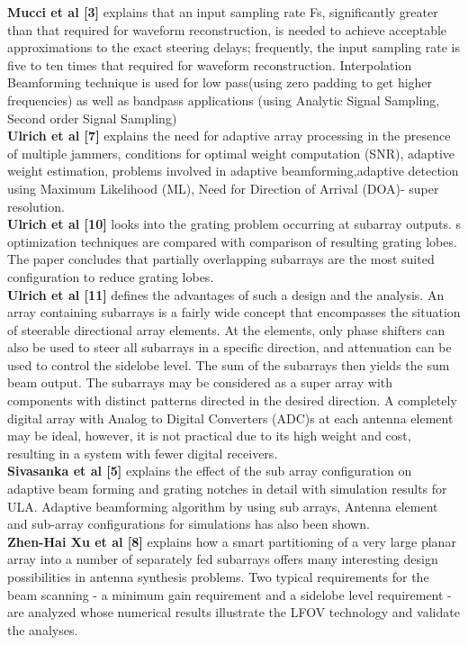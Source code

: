 \textbf{Mucci et al [3]} explains that an input sampling rate Fs, significantly greater than that required for waveform reconstruction, is needed to achieve acceptable approximations to the exact steering delays; frequently, the input sampling rate is five to ten times that required for waveform reconstruction. Interpolation Beamforming  technique is used  for low pass(using zero padding to get higher frequencies) as well as bandpass applications (using Analytic Signal Sampling, Second order Signal Sampling)\\
\textbf{Ulrich et al [7]} explains the need for adaptive array processing in the presence of multiple jammers, conditions for optimal weight computation (SNR), adaptive weight estimation, problems involved in adaptive beamforming,adaptive detection using Maximum Likelihood (ML), Need for Direction of Arrival (DOA)- super resolution.\\
\textbf{Ulrich et al [10]} looks into the grating problem occurring at subarray outputs. s optimization techniques are compared with comparison of resulting grating lobes. The paper concludes that partially overlapping subarrays are the most suited configuration to reduce grating lobes.\\
\textbf{Ulrich et al [11]} defines the advantages of such a design and the analysis. An array containing subarrays is a fairly wide concept that encompasses the situation of steerable directional array elements. At the elements, only phase shifters can also be used to steer all subarrays in a specific direction, and attenuation can be used to control the sidelobe level. The sum of the subarrays then yields the sum beam output. The subarrays may be considered as a super array with components with distinct patterns directed in the desired direction. A completely digital array with Analog to Digital Converters (ADC)s at each antenna element may be ideal, however, it is not practical due to its high weight and cost, resulting in a system with fewer digital receivers.\\
\textbf{Sivasanka et al [5]} explains the effect of the sub array configuration on adaptive beam forming and grating notches in detail with simulation results for ULA. Adaptive beamforming algorithm by using sub arrays, Antenna element and sub-array configurations for simulations has also been shown.\\
\textbf{Zhen-Hai Xu et al [8]} explains how a smart partitioning of a very large planar array into a number of separately fed subarrays offers many interesting design possibilities in antenna synthesis problems. Two typical requirements for the beam scanning - a minimum gain requirement and a sidelobe level requirement - are analyzed whose numerical results illustrate the LFOV technology and validate the analyses.\\
